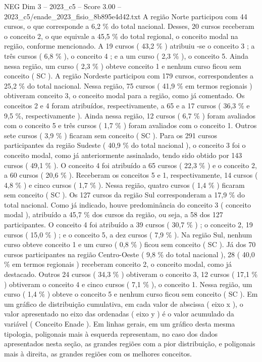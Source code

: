 \begin{textsample}{NEG Dim 3 – 2023\_c5 – Score 3.00 – 2023\_c5/enade\_2023\_fisio\_8b895e4d42.txt}
A região Norte participou com 44 cursos, o que corresponde a 6,2 \% do total nacional.
Desses, 20 cursos receberam o conceito 2, o que equivale a 45,5 \% do total regional, o conceito modal na região, conforme mencionado.
A 19 cursos ( 43,2 \% ) atribuiu -se o conceito 3 ; a três cursos ( 6,8 \% ), o conceito 4 ; e a um curso ( 2,3 \% ), o conceito 5.
Ainda nessa região, um curso ( 2,3 \% ) obteve conceito 1 e nenhum curso ficou sem conceito ( SC ).
A região Nordeste participou com 179 cursos, correspondentes a 25,2 \% do total nacional.
Nessa região, 75 cursos ( 41,9 \% em termos regionais ) obtiveram conceito 3, o conceito modal para a região, como já comentado.
Os conceitos 2 e 4 foram atribuídos, respectivamente, a 65 e a 17 cursos ( 36,3 \% e 9,5 \%, respectivamente ).
Ainda nessa região, 12 cursos ( 6,7 \% ) foram avaliados com o conceito 5 e três cursos ( 1,7 \% ) foram avaliados com o conceito 1.
Outros sete cursos ( 3,9 \% ) ficaram sem conceito ( SC ).
Para os 291 cursos participantes da região Sudeste ( 40,9 \% do total nacional ), o conceito 3 foi o conceito modal, como já anteriormente assinalado, tendo sido obtido por 143 cursos ( 49,1 \% ).
O conceito 4 foi atribuído a 65 cursos ( 22,3 \% ) e o conceito 2, a 60 cursos ( 20,6 \% ).
Receberam os conceitos 5 e 1, respectivamente, 14 cursos ( 4,8 \% ) e cinco cursos ( 1,7 \% ).
Nessa região, quatro cursos ( 1,4 \% ) ficaram sem conceito ( SC ).
Os 127 cursos da região Sul corresponderam a 17,9 \% do total nacional.
Como já indicado, houve predominância do conceito 3 ( conceito modal ), atribuído a 45,7 \% dos cursos da região, ou seja, a 58 dos 127 participantes.
O conceito 4 foi atribuído a 39 cursos ( 30,7 \% ) ; o conceito 2, 19 cursos ( 15,0 \% ) ; e o conceito 5, a dez cursos ( 7,9 \% ).
Na região Sul, nenhum curso obteve conceito 1 e um curso ( 0,8 \% ) ficou sem conceito ( SC ).
Já dos 70 cursos participantes na região Centro-Oeste ( 9,8 \% do total nacional ), 28 ( 40,0 \% em termos regionais ) receberam conceito 2, o conceito modal, como já destacado.
Outros 24 cursos ( 34,3 \% ) obtiveram o conceito 3, 12 cursos ( 17,1 \% ) obtiveram o conceito 4 e cinco cursos ( 7,1 \% ), o conceito 1.
Nessa região, um curso ( 1,4 \% ) obteve o conceito 5 e nenhum curso ficou sem conceito ( SC ).
Em um gráfico de distribuição cumulativa, em cada valor de abscissa ( eixo x ), o valor apresentado no eixo das ordenadas ( eixo y ) é o valor acumulado da variável ( Conceito Enade ).
Em linhas gerais, em um gráfico desta mesma tipologia, poligonais mais à esquerda representam, no caso dos dados apresentados nesta seção, as grandes regiões com a pior distribuição, e poligonais mais à direita, as grandes regiões com os melhores conceitos.

\end{textsample}
